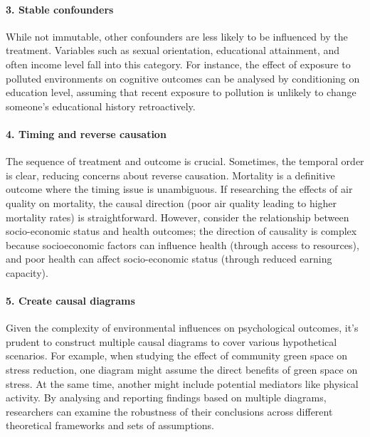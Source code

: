 \documentclass[
  single column]{article}
\let\oldparagraph\paragraph
\renewcommand{\paragraph}[1]{\oldparagraph{#1}\mbox{}}
\begin{document}
\paragraph{3. Stable confounders}\label{stable-confounders}

While not immutable, other confounders are less likely to be influenced
by the treatment. Variables such as sexual orientation, educational
attainment, and often income level fall into this category. For
instance, the effect of exposure to polluted environments on cognitive
outcomes can be analysed by conditioning on education level, assuming
that recent exposure to pollution is unlikely to change someone's
educational history retroactively.

\paragraph{4. Timing and reverse
causation}\label{timing-and-reverse-causation}

The sequence of treatment and outcome is crucial. Sometimes, the
temporal order is clear, reducing concerns about reverse causation.
Mortality is a definitive outcome where the timing issue is unambiguous.
If researching the effects of air quality on mortality, the causal
direction (poor air quality leading to higher mortality rates) is
straightforward. However, consider the relationship between
socio-economic status and health outcomes; the direction of causality is
complex because socioeconomic factors can influence health (through
access to resources), and poor health can affect socio-economic status
(through reduced earning capacity).

\paragraph{5. Create causal diagrams}\label{create-causal-diagrams}

Given the complexity of environmental influences on psychological
outcomes, it's prudent to construct multiple causal diagrams to cover
various hypothetical scenarios. For example, when studying the effect of
community green space on stress reduction, one diagram might assume the
direct benefits of green space on stress. At the same time, another
might include potential mediators like physical activity. By analysing
and reporting findings based on multiple diagrams, researchers can
examine the robustness of their conclusions across different theoretical
frameworks and sets of assumptions.
\end{document}
